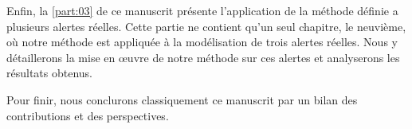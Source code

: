Enfin, la \autoref{part:03} de ce manuscrit présente l’application de
la méthode définie a plusieurs alertes réelles. Cette partie ne
contient qu'un seul chapitre, le neuvième, où notre méthode est
appliquée à la modélisation de trois alertes réelles. Nous y
détaillerons la mise en œuvre de notre méthode sur ces alertes et
analyserons les résultats obtenus.

Pour finir, nous conclurons classiquement ce manuscrit par un bilan
des contributions et des perspectives.


